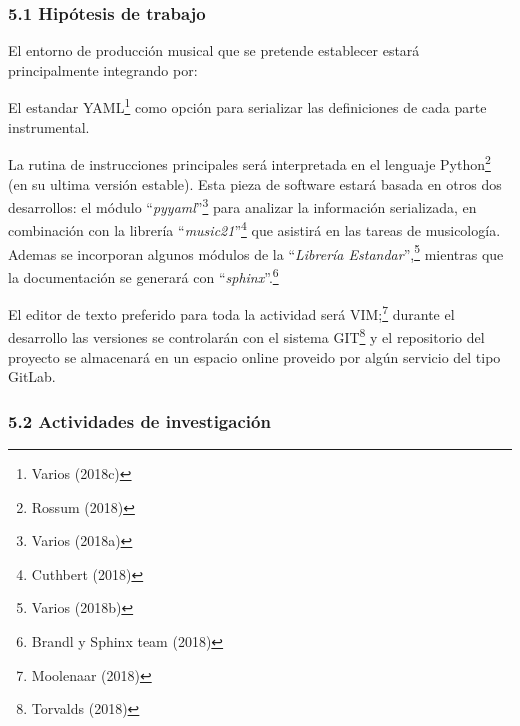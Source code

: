 \documentclass[]{article}
\begin{document}
\hypertarget{hipuxf3tesis-de-trabajo}{%
\subsubsection{5.1 Hipótesis de trabajo}\label{hipuxf3tesis-de-trabajo}}

El entorno de producción musical que se pretende establecer estará
principalmente integrando por:

El estandar YAML\footnote{Varios (2018c)} como opción para serializar
las definiciones de cada parte instrumental.

La rutina de instrucciones principales será interpretada en el lenguaje
Python\footnote{Rossum (2018)} (en su ultima versión estable). Esta
pieza de software estará basada en otros dos desarrollos: el módulo
``\emph{pyyaml}''\footnote{Varios (2018a)} para analizar la información
serializada, en combinación con la librería ``\emph{music21}''\footnote{Cuthbert
  (2018)} que asistirá en las tareas de musicología. Ademas se
incorporan algunos módulos de la ``\emph{Librería Estandar}'',\footnote{Varios
  (2018b)} mientras que la documentación se generará con
``\emph{sphinx}''.\footnote{Brandl y Sphinx team (2018)}

El editor de texto preferido para toda la actividad será VIM;\footnote{Moolenaar
  (2018)} durante el desarrollo las versiones se controlarán con el
sistema GIT\footnote{Torvalds (2018)} y el repositorio del proyecto se
almacenará en un espacio online proveido por algún servicio del tipo
GitLab.

\hypertarget{actividades-de-investigaciuxf3n}{%
\subsubsection{5.2 Actividades de
investigación}\label{actividades-de-investigaciuxf3n}}
\end{document}
